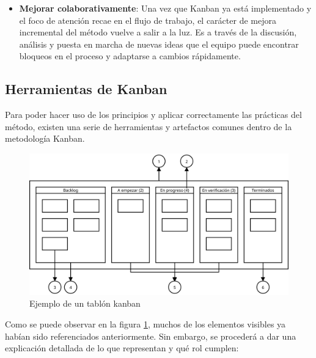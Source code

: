 \begin{itemize}
    \item \textbf{Mejorar colaborativamente}: %
    Una vez que Kanban ya está implementado y el foco de atención recae en el
    flujo de trabajo, el carácter de mejora incremental del método vuelve a
    salir a la luz. Es a través de la discusión, análisis y puesta en marcha de
    nuevas ideas que el equipo puede encontrar bloqueos en el proceso y
    adaptarse a cambios rápidamente.
\end{itemize}

\subsection{Herramientas de Kanban}

Para poder hacer uso de los principios y aplicar correctamente las prácticas del
método, existen una serie de herramientas y artefactos comunes dentro de la
metodología Kanban.

\begin{figure}[H]
    \centering
    \includegraphics[width=0.85\linewidth]{5-Cuerpo/Chapter2/TablonKanban.png}
    \caption{Ejemplo de un tablón kanban}
    \label{fig:kanbanboard}
\end{figure}

Como se puede observar en la figura \ref{fig:kanbanboard}, muchos de los elementos visibles ya
habían sido referenciados anteriormente. Sin embargo, se procederá a dar una
explicación detallada de lo que representan y qué rol cumplen:

